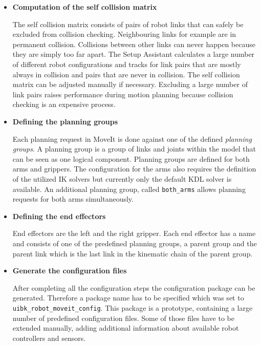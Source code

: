\begin{itemize}

\item \textbf{Computation of the self collision matrix}

The self collision matrix consists of pairs of robot links that can safely be excluded from collision checking. Neighbouring links for example are in permanent collision. Collisions between other links can never happen because they are simply too far apart. The Setup Assistant calculates a large number of different robot configurations and tracks for link pairs that are mostly always in collision and pairs that are never in collision. The self collision matrix can be adjusted manually if necessary. Excluding a large number of link pairs raises performance during motion planning because collision checking is an expensive process.

\item \textbf{Defining the planning groups}

Each planning request in MoveIt is done against one of the defined \emph{planning groups}. A planning group is a group of links and joints within the model that can be seen as one logical component. Planning groups are defined for both arms and grippers. The configuration for the arms also requires the definition of the utilized IK solvers but currently only the default KDL solver is available. An additional planning group, called \texttt{both\_arms} allows planning requests for both arms simultaneously.

\item \textbf{Defining the end effectors}

End effectors are the left and the right gripper. Each end effector has a name and consists of one of the predefined planning groups, a parent group and the parent link which is the last link in the kinematic chain of the parent group.

\item \textbf{Generate the configuration files}

After completing all the configuration steps the configuration package can be generated. Therefore a package name has to be specified which was set to \texttt{uibk\_robot\_moveit\_config}. This package is a prototype, containing a large number of predefined configuration files. Some of those files have to be extended manually, adding additional information about available robot controllers and sensors. 

\end{itemize}

